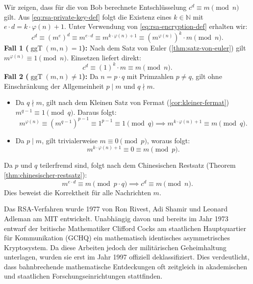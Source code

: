 \begin{math-stroke}
\begin{short-proof}
Wir zeigen, dass für die von Bob berechnete Entschlüsselung $c^d \equiv m \pmod n$ gilt.
Aus \eqref{eq:rsa-private-key-def} folgt die Existenz eines $k \in \mathbb{N}$ mit $e \cdot d = k \cdot \varphi(n) + 1$. Unter Verwendung von \eqref{eq:rsa-encryption-def} erhalten wir:
\[
c^d \equiv (m^e)^d \equiv m^{e \cdot d} \equiv m^{k \cdot \varphi(n) + 1} \equiv (m^{\varphi(n)})^k \cdot m \pmod n.
\]
\textbf{Fall 1 ($\operatorname{ggT}(m, n) = 1$):}
Nach dem Satz von Euler (\cref{thm:satz-von-euler}) gilt $m^{\varphi(n)} \equiv 1 \pmod n$. Einsetzen liefert direkt:
\[
c^d \equiv (1)^k \cdot m \equiv m \pmod n.
\]
\textbf{Fall 2 ($\operatorname{ggT}(m, n) \neq 1$):}
Da $n = p \cdot q$ mit Primzahlen $p \neq q$, gilt ohne Einschränkung der Allgemeinheit $p \mid m$ und $q \nmid m$.
\begin{itemize}
    \item Da $q \nmid m$, gilt nach dem Kleinen Satz von Fermat (\cref{cor:kleiner-fermat}) $m^{q-1} \equiv 1 \pmod q$. Daraus folgt:
    \[
    m^{\varphi(n)} \equiv (m^{q-1})^{p-1} \equiv 1^{p-1} \equiv 1 \pmod q \implies m^{k \cdot \varphi(n) + 1} \equiv m \pmod q.
    \]
    \item Da $p \mid m$, gilt trivialerweise $m \equiv 0 \pmod p$, woraus folgt:
    \[
    m^{k \cdot \varphi(n) + 1} \equiv 0 \equiv m \pmod p.
    \]
\end{itemize}
Da $p$ und $q$ teilerfremd sind, folgt nach dem Chinesischen Restsatz (Theorem \ref{thm:chinesischer-restsatz}):
\[
m^{e \cdot d} \equiv m \pmod{p \cdot q} \implies c^d \equiv m \pmod n.
\]
Dies beweist die Korrektheit für alle Nachrichten $m$.
\end{short-proof}
\end{math-stroke}

\begin{didactic-insight}
Das RSA-Verfahren wurde 1977 von Ron Rivest, Adi Shamir und Leonard Adleman am MIT entwickelt. Unabhängig davon und bereits im Jahr 1973 entwarf der britische Mathematiker Clifford Cocks am staatlichen Hauptquartier für Kommunikation (GCHQ) ein mathematisch identisches asymmetrisches Kryptosystem. Da diese Arbeiten jedoch der militärischen Geheimhaltung unterlagen, wurden sie erst im Jahr 1997 offiziell deklassifiziert. Dies verdeutlicht, dass bahnbrechende mathematische Entdeckungen oft zeitgleich in akademischen und staatlichen Forschungseinrichtungen stattfinden.
\end{didactic-insight}

